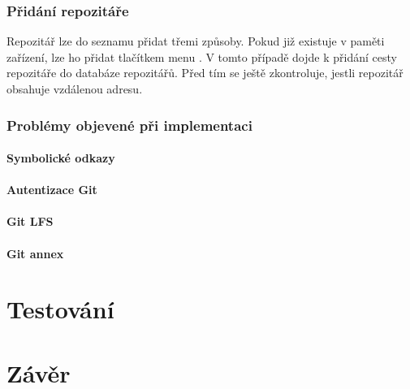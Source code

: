 \subsection{Přidání repozitáře}
Repozitář lze do seznamu přidat třemi způsoby. Pokud již existuje v paměti zařízení, lze ho přidat tlačítkem menu . V tomto případě dojde k přidání cesty repozitáře do databáze repozitářů. Před tím se ještě zkontroluje, jestli repozitář obsahuje vzdálenou adresu.

\subsection{Problémy objevené při implementaci}\label{sec:problemy_implem}
\subsubsection{Symbolické odkazy}\label{sec:problemy_symb}
\subsubsection{Autentizace Git}\label{sec:problemy_autent}
\subsubsection{Git LFS}\label{sec:problemy_lfs}
\subsubsection{Git annex}\label{sec:problemy_annex}


\chapter{Testování}
\chapter{Závěr}